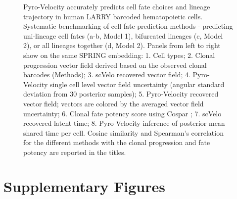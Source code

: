 \documentclass[
  sn-mathphys-num,
  lineno,
  twocolumn]{sn-jnl}
\begin{document}
\begin{figure}


\caption{\label{fig-lineage-tracing}Pyro-Velocity accurately predicts
cell fate choices and lineage trajectory in human LARRY barcoded
hematopoietic cells. Systematic benchmarking of cell fate prediction
methods - predicting uni-lineage cell fates (a-b, Model 1), bifurcated
lineages (c, Model 2), or all lineages together (d, Model 2). Panels
from left to right show on the same SPRING embedding: 1. Cell types; 2.
Clonal progression vector field derived based on the observed clonal
barcodes (Methods); 3. scVelo recovered vector field; 4. Pyro-Velocity
single cell level vector field uncertainty (angular standard deviation
from 30 posterior samples); 5. Pyro-Velocity recovered vector field;
vectors are colored by the averaged vector field uncertainty; 6. Clonal
fate potency score using Cospar \citep{Wang2022-xb}; 7. scVelo recovered
latent time; 8. Pyro-Velocity inference of posterior mean shared time
per cell. Cosine similarity and Spearman's correlation for the different
methods with the clonal progression and fate potency are reported in the
titles.}

\end{figure}%

\FloatBarrier
\clearpage

\newpage{}

\section{Supplementary Figures}\label{supplementary-figures}
\end{document}
